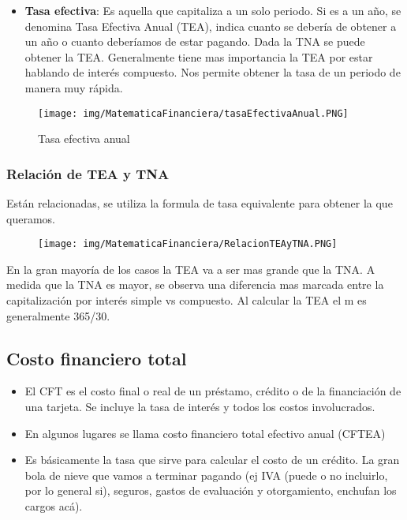 \documentclass[titlepage,a4paper]{article}
\begin{document}
\newpage
\begin{itemize}
\item \textbf{Tasa efectiva}: Es aquella que capitaliza a un solo periodo. Si es a un año, se denomina Tasa Efectiva Anual (TEA), indica cuanto se debería de obtener a un año o cuanto deberíamos de estar pagando. Dada la TNA se puede obtener la TEA. Generalmente tiene mas importancia la TEA por estar hablando de interés compuesto. Nos permite obtener la tasa de un periodo de manera muy rápida.
\end{itemize}

\begin{figure}[!htb]
    \centering
    \texttt{[image: img/MatematicaFinanciera/tasaEfectivaAnual.PNG]}
    \caption{Tasa efectiva anual}
\end{figure}




\subsubsection*{Relación de TEA y TNA}
Están relacionadas, se utiliza la formula de tasa equivalente para obtener la que queramos.

\begin{figure}[!htb]
    \centering
    \texttt{[image: img/MatematicaFinanciera/RelacionTEAyTNA.PNG]}
\end{figure}

En la gran mayoría de los casos la TEA va a ser mas grande que la TNA. A medida que la TNA es mayor, se observa una diferencia mas marcada entre la capitalización por interés simple vs compuesto.  Al calcular la TEA el m es generalmente 365/30.

\subsection{Costo financiero total}
\begin{itemize}
\item El CFT es el costo final o real de un préstamo, crédito o de la financiación de una tarjeta. Se incluye la tasa de interés y todos los costos involucrados.
\item En algunos lugares se llama costo financiero total efectivo anual (CFTEA)
\item Es básicamente la tasa que sirve para calcular el costo de un crédito. La gran bola de nieve que vamos a terminar pagando (ej IVA (puede o no incluirlo, por lo general si), seguros, gastos de evaluación y otorgamiento, enchufan los cargos acá).
\end{itemize}
\end{document}
